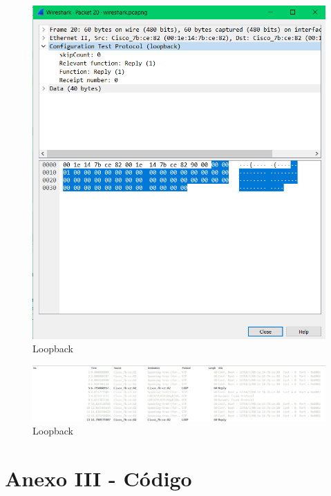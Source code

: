 \documentclass[article, a4paper, 11pt, oneside]{memoir}
\begin{document}
\begin{figure}[h]
	\centering
\includegraphics[scale=0.30]{loopback.png}
\caption{Loopback}
\end{figure}

\begin{figure}[h]
	\centering
\includegraphics[scale=0.30]{loopback-2.png}
\caption{Loopback}
\end{figure}

\newpage
\section{Anexo III - Código}
\end{document}
